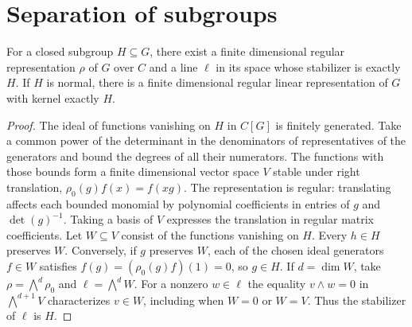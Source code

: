 \section{Separation of subgroups}

\begin{lemma}
\label{res:PV15}
For a closed subgroup \(H\subseteq G\), there exist a finite
dimensional regular representation \(\rho\) of \(G\) over \(C\)
and a line \(\ell\) in its space whose stabilizer is exactly \(H\).
If \(H\) is normal, there is a finite dimensional regular
linear representation of \(G\) with kernel exactly \(H\).
\end{lemma}

\begin{proof}
The ideal of functions vanishing on \(H\) in \(C[G]\) is
finitely generated. Take a common power of the determinant in
the denominators of representatives of the generators and bound
the degrees of all their numerators. The functions with those
bounds form a finite dimensional vector space \(V\) stable
under right translation, \(\rho_0(g)f(x)=f(xg)\).
The representation is regular: translating affects each bounded
monomial by polynomial coefficients in entries of \(g\) and
\(\det(g)^{-1}\). Taking a basis of \(V\) expresses the translation
in regular matrix coefficients. Let \(W\subseteq V\) consist of
the functions vanishing on \(H\). Every \(h\in H\) preserves
\(W\). Conversely, if \(g\) preserves \(W\), each of the chosen
ideal generators \(f\in W\) satisfies \(f(g)=(\rho_0(g)f)(1)=0\),
so \(g\in H\). If \(d=\dim W\), take
\(\rho=\bigwedge^d\rho_0\) and \(\ell=\bigwedge^d W\).
For a nonzero \(w\in\ell\) the equality \(v\wedge w=0\) in
\(\bigwedge^{d+1}V\) characterizes \(v\in W\), including when
\(W=0\) or \(W=V\). Thus the stabilizer of \(\ell\) is \(H\).


\end{proof}

